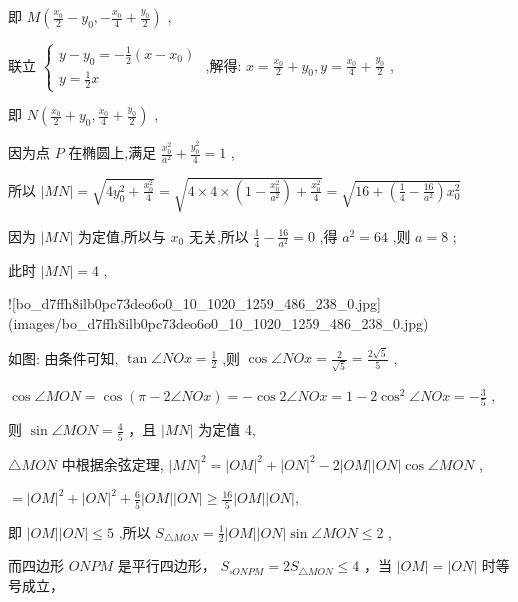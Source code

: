 \documentclass[10pt]{article}
\begin{document}
即 \(M\left( {\frac{{x}_{0}}{2} - {y}_{0}, - \frac{{x}_{0}}{4} + \frac{{y}_{0}}{2}}\right)\) ,

联立 \(\left\{  \begin{array}{l} y - {y}_{0} =  - \frac{1}{2}\left( {x - {x}_{0}}\right) \\  y = \frac{1}{2}x \end{array}\right.\) ,解得: \(x = \frac{{x}_{0}}{2} + {y}_{0}, y = \frac{{x}_{0}}{4} + \frac{{y}_{0}}{2}\) ,

即 \(N\left( {\frac{{x}_{0}}{2} + {y}_{0},\frac{{x}_{0}}{4} + \frac{{y}_{0}}{2}}\right)\) ,

因为点 \(P\) 在椭圆上,满足 \(\frac{{x}_{0}^{2}}{{a}^{2}} + \frac{{y}_{0}^{2}}{4} = 1\) ,

所以 \(\left| {MN}\right|  = \sqrt{4{y}_{0}^{2} + \frac{{x}_{0}^{2}}{4}} = \sqrt{4 \times  4 \times  \left( {1 - \frac{{x}_{0}^{2}}{{a}^{2}}}\right)  + \frac{{x}_{0}^{2}}{4}} = \sqrt{{16} + \left( {\frac{1}{4} - \frac{16}{{a}^{2}}}\right) {x}_{0}^{2}}\)

因为 \(\left| {MN}\right|\) 为定值,所以与 \({x}_{0}\) 无关,所以 \(\frac{1}{4} - \frac{16}{{a}^{2}} = 0\) ,得 \({a}^{2} = {64}\) ,则 \(a = 8\) ;

此时 \(\left| {MN}\right|  = 4\) ,

![bo_d7ffh8ilb0pc73deo6o0_10_1020_1259_486_238_0.jpg](images/bo_d7ffh8ilb0pc73deo6o0_10_1020_1259_486_238_0.jpg)

如图: 由条件可知, \(\tan \angle {NOx} = \frac{1}{2}\) ,则 \(\cos \angle {NOx} = \frac{2}{\sqrt{5}} = \frac{2\sqrt{5}}{5}\) ,

\(\cos \angle {MON} = \cos \left( {\pi  - 2\angle {NOx}}\right)  =  - \cos 2\angle {NOx} = 1 - 2{\cos }^{2}\angle {NOx} =  - \frac{3}{5}\) ,

则 \(\sin \angle {MON} = \frac{4}{5}\) ，且 \(\left| {MN}\right|\) 为定值 4,

\(\bigtriangleup {MON}\) 中根据余弦定理, \({\left| MN\right| }^{2} = {\left| OM\right| }^{2} + {\left| ON\right| }^{2} - 2\left| {OM}\right| \left| {ON}\right| \cos \angle {MON}\) ,

\(= {\left| OM\right| }^{2} + {\left| ON\right| }^{2} + \frac{6}{5}\left| {OM}\right| \left| {ON}\right|  \geq  \frac{16}{5}\left| {OM}\right| \left| {ON}\right| ,\)

即 \(\left| {OM}\right| \left| {ON}\right|  \leq  5\) ,所以 \({S}_{\bigtriangleup {MON}} = \frac{1}{2}\left| {OM}\right| \left| {ON}\right| \sin \angle {MON} \leq  2\) ,

而四边形 \({ONPM}\) 是平行四边形， \({S}_{\square {ONPM}} = 2{S}_{\bigtriangleup {MON}} \leq  4\) ，当 \(\left| {OM}\right|  = \left| {ON}\right|\) 时等号成立，
\end{document}

